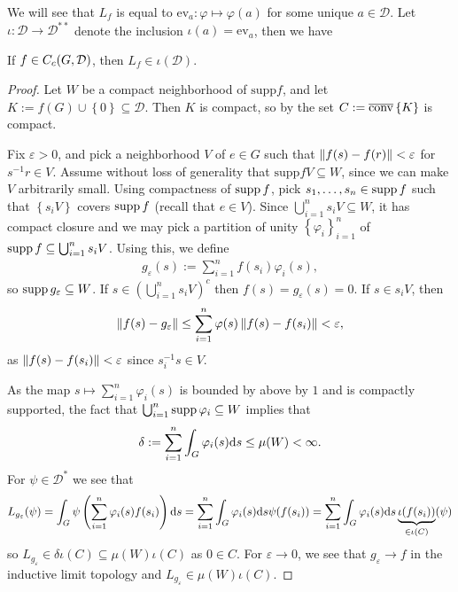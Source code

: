 We will see that $L_f$ is equal to $ \mathrm{ev}_a\colon \varphi \mapsto \varphi(a)$ for some unique $a \in \mathcal{D}$. Let $\iota \colon \mathcal{D} \to \mathcal{D}^{**}$ denote the inclusion $\iota(a) = \mathrm{ev}_a$, then we have
\begin{lemma}
If $f \in C_c(G,\mathcal{D})$, then $L_f \in \iota(\mathcal{D})$.
\label{int:defintegral}
\end{lemma}
\begin{proof}
Let $W$ be a compact neighborhood of $\mathrm{supp} f$, and let $K:= f(G) \cup \left\{ 0 \right\} \subseteq \mathcal{D}$. Then $K$ is compact, so by  the set $C := \overline {\operatorname{conv}} \left\{ K \right\}$ is compact.

Fix $\varepsilon > 0$, and pick a neighborhood $V$ of $e \in G$ such that $ \left\lVert f(s) - f(r) \right\rVert < \varepsilon$ for $s^{-1}r \in V$. Assume without loss of generality that $\mathrm{supp} f V \subseteq W$, since we can make $V$ arbitrarily small. Using compactness of $\operatorname{supp} f$, pick $s_1,\dots,s_n \in \operatorname{supp} f$ such that $\left\{ s_i V \right\}$ covers $\operatorname{supp} f$ (recall that $e \in V$). Since $ \bigcup_{i=1}^n  s_i V \subseteq W$, it has compact closure and we may pick a partition of unity $\left\{ \varphi_i \right\}_{i=1}^n$ of $ \operatorname{supp} f \subseteq \bigcup_{i=1}^n s_i V$. Using this, we define 
\begin{align*}
	g_\varepsilon (s) := \sum_{i=1}^n f(s_i) \varphi_i(s),
\end{align*}
so $\operatorname{supp} g_\varepsilon \subseteq W$. If $s \in \left( \bigcup_{i=1}^n s_i V \right)^c$ then $f(s) = g_{\varepsilon}(s) = 0$. If $s \in s_i V$, then
\begin{align*}
	\left\lVert f(s) - g_{\varepsilon} \right\rVert  \leq \sum_{i=1}^n \varphi(s) \left\lVert f(s)-f(s_i) \right\rVert  < \varepsilon,
\end{align*}
as $\left\lVert f(s) - f(s_i) \right\rVert < \varepsilon$ since $s_i^{-1}s \in V$.

As the map $s \mapsto \sum_{i=1}^n \varphi_i(s)$ is bounded by above by $1$ and is compactly supported, the fact that $\bigcup_{i=1}^n \operatorname{supp} \varphi_i \subseteq W$ implies that
\begin{align*}
	\delta := \sum_{i=1}^n \int_G \varphi_i(s) \mathrm{d} s \leq \mu(W) < \infty.
\end{align*}
For $\psi \in \mathcal{D}^*$ we see that
\begin{align*}
	L_{g_{\varepsilon}} ( \psi ) = \int_{G} \psi\left( \sum_{i=1}^n \varphi_i(s) f(s_i) \right) \mathrm{d} s = \sum_{i=1}^n \int_G \varphi_i(s) \mathrm{d} s \psi(f(s_i)) = \sum_{i=1}^n \int_G \varphi_i(s) \mathrm{d} s \underbrace{\iota(f(s_i))}_{ \in \iota(C)} (\psi) 
\end{align*}
so $L_{g_{\varepsilon}}  \in \delta \iota(C) \subseteq \mu(W) \iota(C)$ as $0 \in C$. For $\varepsilon \to 0$, we see that $g_{\varepsilon} \to f$ in the inductive limit topology and $L_{g_\varepsilon} \in \mu(W) \iota(C)$. 


\end{proof}

